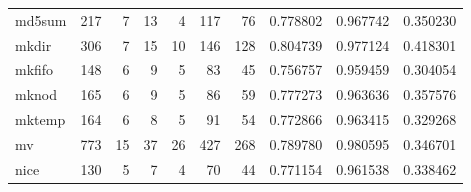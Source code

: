 \begin{longtable}{lrrrrrrrrr}
md5sum    &                    217 &                                  7 &                                13 &                                4 &                               117 &                              76 &                                0.778802 &                               0.967742 &                             0.350230 \\
mkdir     &                    306 &                                  7 &                                15 &                               10 &                               146 &                             128 &                                0.804739 &                               0.977124 &                             0.418301 \\
mkfifo    &                    148 &                                  6 &                                 9 &                                5 &                                83 &                              45 &                                0.756757 &                               0.959459 &                             0.304054 \\
mknod     &                    165 &                                  6 &                                 9 &                                5 &                                86 &                              59 &                                0.777273 &                               0.963636 &                             0.357576 \\
mktemp    &                    164 &                                  6 &                                 8 &                                5 &                                91 &                              54 &                                0.772866 &                               0.963415 &                             0.329268 \\
mv        &                    773 &                                 15 &                                37 &                               26 &                               427 &                             268 &                                0.789780 &                               0.980595 &                             0.346701 \\
nice      &                    130 &                                  5 &                                 7 &                                4 &                                70 &                              44 &                                0.771154 &                               0.961538 &                             0.338462 \\

\end{longtable}
